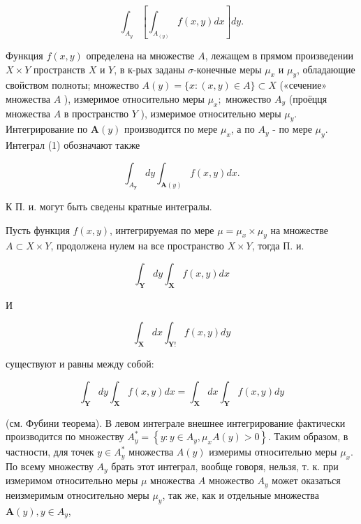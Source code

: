 \documentclass[10pt]{article}
\begin{document}
\[

\int_{A_{y}}\left[\int_{A_{(y)}} f(x, y) d x\right] d y .

\]



Функция $f(x, y)$ определена на множестве $A$, лежащем в прямом произведении $X \times Y$ пространств $X$ и $Y$, в к-рых заданы $\sigma$-конечные меры $\mu_{x}$ и $\mu_{y}$, обладающие свойством полноты; множество $A(y)=\{x:(x, y) \in A\} \subset X$ («сечение» множества $A$ ), измеримое относительно меры $\mu_{x} ;$ множество $A_{y}$ (проёцця множества $A$ в пространство $Y$ ), измеримое относительно меры $\mu_{y}$. Интегрирование по $\boldsymbol{A}(y)$ производится по мере $\mu_{x}$, а по $A_{y}$ - по мере $\mu_{y}$. Интеграл (1) обозначают также



\[

\int_{A_{\boldsymbol{y}}} d y \int_{\boldsymbol{A}(y)} f(x, y) d x .

\]



К П. и. могут быть сведены кратные интегралы.



Пусть функция $f(x, y)$, интегрируемая по мере $\mu=\mu_{x} \times \mu_{y}$ на множестве $A \subset X \times Y$, продолжена нулем на все пространство $X \times Y$, тогда П. и.



\[

\int_{\boldsymbol{Y}} d y \int_{\boldsymbol{X}} f(x, y) d x

\]



И



\[

\int_{\boldsymbol{X}} d x \int_{\boldsymbol{Y} !} f(x, y) d y

\]



существуют и равны между собой:



\[

\int_{\boldsymbol{Y}} d y \int_{\boldsymbol{X}} f(x, y) d x=\int_{\boldsymbol{X}} d x \int_{\boldsymbol{Y}} f(x, y) d y

\]



(см. Фубини теорема). В левом интеграле внешнее интегрирование фактически производится по множеству $A_{y}^{*}=\left\{y: y \in A_{y}, \mu_{x} A(y)>0\right\}$. Таким образом, в частности, для точек $y \in A_{y}^{*}$ множества $A(y)$ измеримы относительно меры $\mu_{x}$. По всему множеству $A_{y}$ брать этот интеграл, вообще говоря, нельзя, т. к. при измеримом относительно меры $\mu$ множества $A$ множество $A_{y}$ может оказаться неизмеримым относительно меры $\mu_{y}$, так же, как и отдельные множества $\boldsymbol{A}(y), y \in A_{y}$,
\end{document}
